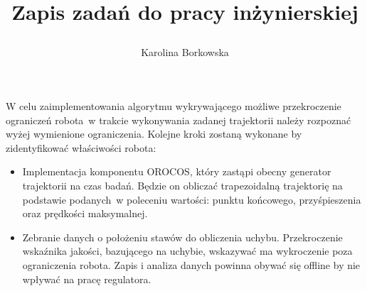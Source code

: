\documentclass[a4paper, 12pt]{article}
\title{Zapis zadań do pracy inżynierskiej \author{Karolina Borkowska}}
\begin{document}
	\maketitle

	\vspace{50px}

	W celu zaimplementowania algorytmu wykrywającego możliwe przekroczenie ograniczeń robota~w trakcie wykonywania zadanej trajektorii należy rozpoznać wyżej wymienione ograniczenia. Kolejne kroki zostaną wykonane by zidentyfikować właściwości robota:
	\begin{itemize}
	\item Implementacja komponentu OROCOS, który zastąpi obecny generator trajektorii na czas badań. Będzie on obliczać trapezoidalną trajektorię na podstawie podanych~w poleceniu wartości: punktu końcowego, przyśpieszenia oraz prędkości maksymalnej. 
	\item Zebranie danych o położeniu stawów do obliczenia uchybu. Przekroczenie wskaźnika jakości, bazującego na uchybie, wskazywać ma wykroczenie poza ograniczenia robota. Zapis i analiza danych powinna obywać się offline by nie wpływać na pracę regulatora.
	
	\end{itemize}
	
	
\end{document}
